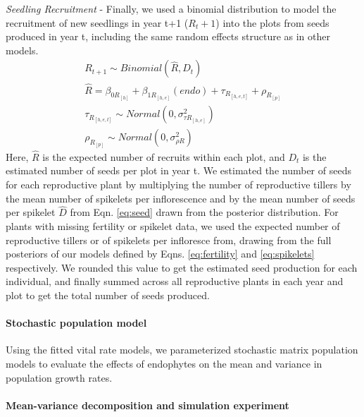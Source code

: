 \documentclass[12pt]{article}
\begin{document}
\emph{Seedling Recruitment} - Finally, we used a binomial distribution to model the recruitment of new seedlings in year t+1 ($R_t+1$) into the plots from seeds produced in year t, including the same random effects structure as in other models.
\begin{subequations} 
	\label{eq:recruitment}
	\begin{align}
		R_{t+1} \sim Binomial(\hat{R}, D_t) \\
		\hat{R} =  \beta_{0R_{[h]}} + \beta_{1R_{[h,e]}}(endo) + \tau_{R_{[h,e,t]}} + \rho_{R_{[p]}} \\
		\tau_{R_{[h,e,t]}} \sim Normal(0, \sigma^2_{\tau R_{[h,e]}})\\
		\rho_{R_{[p]}} \sim Normal(0, \sigma^2_{\rho R})
	\end{align}
\end{subequations}
Here, $\hat{R}$ is the expected number of recruits within each plot, and $D_t$ is the estimated number of seeds per plot in year t. 
We estimated the number of seeds for each reproductive plant by multiplying the number of reproductive tillers by the mean number of spikelets per inflorescence and by the mean number of seeds per spikelet $\hat{D}$ from Eqn. \ref{eq:seed} drawn from the posterior distribution. 
For plants with missing fertility or spikelet data, we used the expected number of reproductive tillers or of spikelets per infloresce from, drawing from the full posteriors of our models defined by Eqns. \ref{eq:fertility} and \ref{eq:spikelets} respectively. 
We rounded this value to get the estimated seed production for each individual, and finally summed across all reproductive plants in each year and plot to get the total number of seeds produced. 



\paragraph*{Stochastic population model}
Using the fitted vital rate models, we parameterized stochastic matrix population models to evaluate the effects of endophytes on the mean and variance in population growth rates.

\paragraph*{Mean-variance decomposition and simulation experiment}
\end{document}
